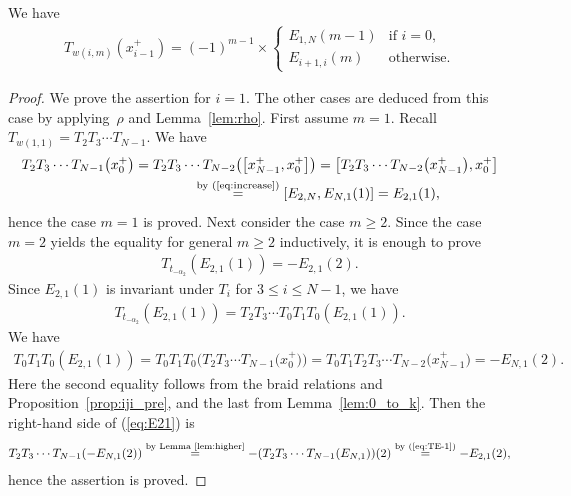 \begin{lem}\label{lem:classical_part} We have
\begin{gather*} T_{w(i,m)}(x_{i-1}^+) = (-1)^{m-1} \times \begin{cases}
E_{1,N}(m-1) & \text{if $i=0$},\\
E_{i+1,i}(m) & \text{otherwise}.
\end{cases}
\end{gather*}
\end{lem}
\begin{proof}We prove the assertion for $i=1$. The other cases are deduced from this case by applying~$\rho$ and Lemma~\ref{lem:rho}. First assume $m=1$. Recall $T_{w(1,1)}=T_2 T_3 \cdots T_{N-1}$. We have
\begin{gather*}
T_2 T_3 \cdots T_{N-1}\big(x_0^+\big) = T_2 T_3 \cdots T_{N-2} \big(\big[x_{N-1}^+,x_0^+\big]\big) = \big[T_2 T_3 \cdots T_{N-2} \big(x_{N-1}^+\big),x_0^+\big] \\
\hphantom{T_2 T_3 \cdots T_{N-1}\big(x_0^+\big)}{} \overset{\text{by (\ref{eq:increase})}}{=} [E_{2,N}, E_{N,1}(1)] = E_{2,1}(1),
\end{gather*}
hence the case $m=1$ is proved. Next consider the case $m \geq 2$. Since the case $m=2$ yields the equality for general $m \geq 2$ inductively, it is enough to prove
\begin{gather*}
T_{t_{-\alpha_2}}(E_{2,1}(1))=-E_{2,1}(2).
\end{gather*}
Since $E_{2,1}(1)$ is invariant under $T_i$ for $3 \leq i \leq N-1$, we have
\begin{gather}
T_{t_{-\alpha_2}}(E_{2,1}(1)) = T_2 T_3 \cdots T_0 T_1 T_0 (E_{2,1}(1)).\label{eq:E21}
\end{gather}
We have
\begin{gather*}
T_0 T_1 T_0 (E_{2,1}(1)) = T_0 T_1 T_0 \big(T_2 T_3 \cdots T_{N-1}\big(x_0^+\big)\big) = T_0 T_1 T_2 T_3 \cdots T_{N-2}\big(x_{N-1}^+\big) = -E_{N,1}(2).
\end{gather*}
Here the second equality follows from the braid relations and Proposition~\ref{prop:iji_pre}, and the last from Lemma~\ref{lem:0_to_k}. Then the right-hand side of (\ref{eq:E21}) is
\begin{gather*}
T_2 T_3 \cdots T_{N-1} (-E_{N,1}(2)) \overset{\text{by Lemma~\ref{lem:higher}}}{=} - (T_2 T_3 \cdots T_{N-1} (E_{N,1}) )(2) \overset{\text{by (\ref{eq:TE-1})}}{=} -E_{2,1}(2),
\end{gather*}
hence the assertion is proved.
\end{proof}

